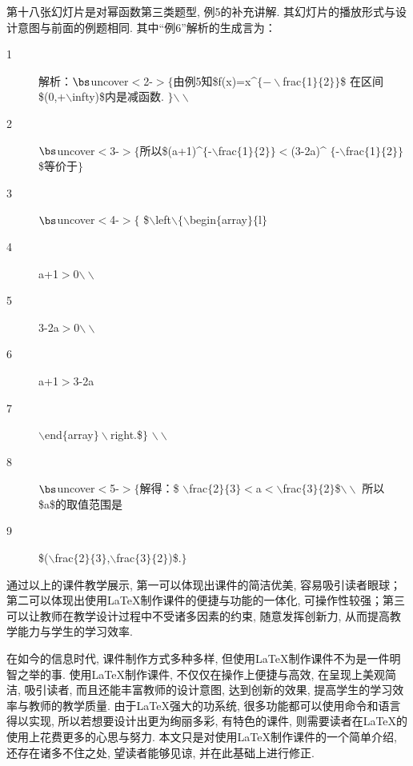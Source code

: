 第十八张幻灯片是对幂函数第三类题型, 例5的补充讲解. 其幻灯片的播放形式与设计意图与前面的例题相同. 其中“例6”解析的生成言为：
\begin{description}
  \item[1] 解析：$\bs$uncover$<$2-$>\{$由例5知\$f(x)=x\^{}$\{-\backslash$frac$\{$1$\}\{$2$\}\}$\$
      在区间\$(0,+$\backslash$infty)\$内是减函数. $\}$$\backslash\backslash$
  \item[2]$\bs$uncover$<$3-$>\{$所以\$(a+1)\^{}$\{$-$\backslash$frac$\{$1$\}\{$2$\}\}<$(3-2a)\^{}
     $\{$-$\backslash$frac$\{$1$\}\{$2$\}\}$\$等价于$\}$
  \item[3]$\bs$uncover$<$4-$>\{$ \$$\backslash$left$\backslash\{\backslash$begin$\{$array$\}\{$l$\}$
  \item[4]  a+1$>$0$\backslash\backslash$
  \item[5] 3-2a$>$0$\backslash\backslash$
  \item[6] a+1$>$3-2a
  \item[7] $\backslash$end$\{$array$\}\backslash$right.\$$\}$ $\backslash\backslash$
  \item[8]$\bs$uncover$<$5-$>\{$解得：\$
     $\backslash$frac$\{$2$\}\{$3$\}<$a$<\backslash$frac$\{$3$\}\{$2$\}$\$$\backslash\backslash$
      所以\$a\$的取值范围是
  \item[9] \$($\backslash$frac$\{$2$\}\{$3$\}$,$\backslash$frac$\{$3$\}\{$2$\}$)\$.$\}$
\end{description}


通过以上的课件教学展示, 第一可以体现出课件的简洁优美, 容易吸引读者眼球；第二可以体现出使用\LaTeX{}制作课件的便捷与功能的一体化, 可操作性较强；第三可以让教师在教学设计过程中不受诸多因素的约束, 随意发挥创新力, 从而提高教学能力与学生的学习效率.


在如今的信息时代, 课件制作方式多种多样, 但使用\LaTeX{}制作课件不为是一件明智之举的事. 使用\LaTeX{}制作课件, 不仅仅在操作上便捷与高效, 在呈现上美观简洁, 吸引读者, 而且还能丰富教师的设计意图, 达到创新的效果, 提高学生的学习效率与教师的教学质量. 由于\LaTeX{}强大的功系统, 很多功能都可以使用命令和语言得以实现, 所以若想要设计出更为绚丽多彩, 有特色的课件, 则需要读者在\LaTeX{}的使用上花费更多的心思与努力. 本文只是对使用\LaTeX{}制作课件的一个简单介绍, 还存在诸多不住之处, 望读者能够见谅, 并在此基础上进行修正.
